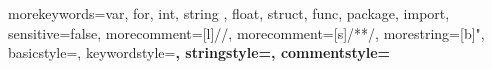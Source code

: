     {   morekeywords={var, for, int, string , float, struct, func, package, import},
        sensitive=false,
        morecomment=[l]{//},
        morecomment=[s]{/*}{*/},
        morestring=[b]",
        basicstyle=\ttfamily,
        keywordstyle=\color{teal}\bfseries,
        stringstyle=\color{brown}\bfseries,
        commentstyle=\color{purple}\bfseries
}
